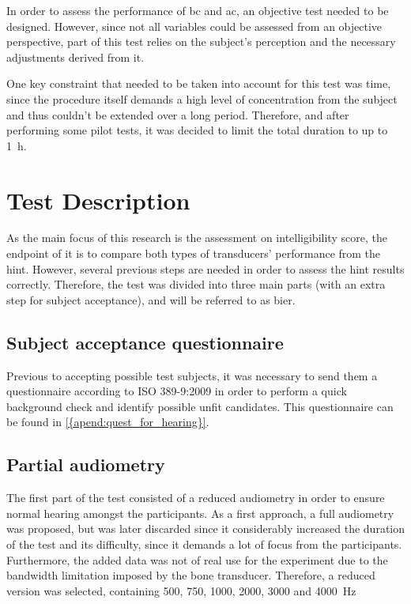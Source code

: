 In order to assess the performance of \gls{bc} and \gls{ac}, an objective test needed to be designed. However, since not all variables could be assessed from an objective perspective, part of this test relies on the subject's perception and the necessary adjustments derived from it.

One key constraint that needed to be taken into account for this test was time, since the procedure itself demands a high level of concentration from the subject and thus couldn't be extended over a long period. Therefore, and after performing some pilot tests, it was decided to limit the total duration to up to \SI{1}{\hour}.
\section{Test Description}
\label{sec:test_description}

As the main focus of this research is the assessment on intelligibility score, the endpoint of it is to compare both types of transducers' performance from the \gls{hint}. However, several previous steps are needed in order to assess the \gls{hint} results correctly. Therefore, the test was divided into three main parts (with an extra step for subject acceptance), and will be referred to as \gls{bier}.

\subsection{Subject acceptance questionnaire}
Previous to accepting possible test subjects, it was necessary to send them a questionnaire according to ISO 389-9:2009 \citep{iso_389-9} in order to perform a quick background check and identify possible unfit candidates. This questionnaire can be found in \autoref{{apend:quest_for_hearing}}.

\subsection{Partial audiometry}
The first part of the test consisted of a reduced audiometry in order to ensure normal hearing amongst the participants. As a first approach, a full audiometry was proposed, but was later discarded since it considerably increased the duration of the test and its difficulty, since it demands a lot of focus from the participants. Furthermore, the added data was not of real use for the experiment due to the bandwidth limitation imposed by the bone transducer.
Therefore, a reduced version was selected, containing 500, 750, 1000, 2000, 3000 and \SI{4000}{\hertz}

